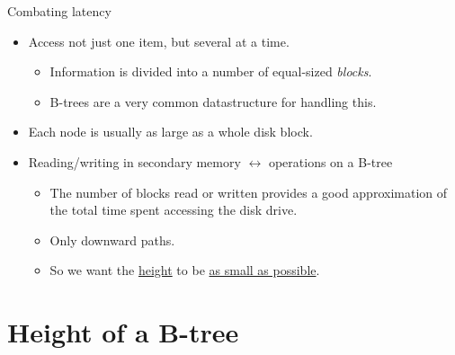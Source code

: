 \documentclass[11pt,t]{beamer}
\begin{document}
	\begin{frame}{Combating latency}
		\begin{itemize}[<+->]
			\item Access not just one item, but several at a time.
			\begin{itemize}
				\item Information is divided into a number of equal-sized \textit{blocks}.
				\item B-trees are a very common datastructure for handling this.
			\end{itemize}
			\item Each node is usually as large as a whole disk block.
			\item Reading/writing in secondary memory \(\leftrightarrow\) operations on a B-tree
			\begin{itemize}[<+->]
				\item The number of blocks read or written provides a good approximation of the total time spent accessing the disk drive.
				\item Only downward paths.
				\item So we want the \underline{height} to be \underline{as small as possible}.
			\end{itemize}
		\end{itemize}
	\end{frame}

	\section{Height of a B-tree}
\end{document}
